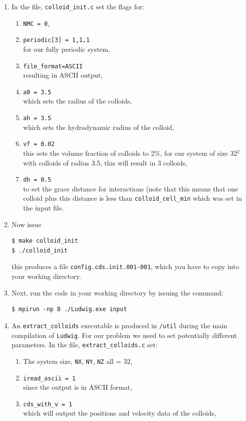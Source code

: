 \documentclass[11pt,twoside,a4paper]{article}
\begin{document}
\begin{enumerate}
\item In the file, \texttt{colloid\_init.c} set the flags for:
\begin{enumerate}
\item \texttt{NMC = 0},
\item \texttt{periodic[3] = {1,1,1}} \\ for our fully periodic system,
\item \texttt{file\_format=ASCII} \\ resulting in ASCII output,
\item \texttt{a0 = 3.5} \\ which sets the radius of the colloids,
\item \texttt{ah = 3.5} \\ which sets the hydrodynamic radius of the colloid,
\item \texttt{vf = 0.02} \\ this sets the volume fraction of colloids to 2\%, for our system of size 32$^2$ with colloids of radius 3.5, this will result in 3 colloids,
\item \texttt{dh = 0.5} \\ to set the grace distance for interactions (note that this means that one colloid plus this distance is less than \texttt{colloid\_cell\_min} which was set in the input file.
\end{enumerate}
\item Now issue
\begin{lstlisting}
$ make colloid_init
$ ./colloid_init
\end{lstlisting}
this produces a file \texttt{config.cds.init.001-001}, which you have to copy into your working directory.
\item Next, run the code in your working directory by issuing the command:
\begin{lstlisting}
$ mpirun -np 8 ./Ludwig.exe input
\end{lstlisting}
\item An \texttt{extract\_colloids} executable is produced in \texttt{/util} during the main compilation of \texttt{Ludwig}. 
For our problem we need to set potentially different parameters. In the file, \texttt{extract\_colloids.c} set:
\begin{enumerate}
\item The system size, \texttt{NX},  \texttt{NY},  \texttt{NZ} all = 32,
\item \texttt{iread\_ascii = 1} \\ since the output is in ASCII format,
\item \texttt{cds\_with\_v  = 1} \\ which will output the positions and velocity data of the colloids,

\end{enumerate}
\end{enumerate}
\end{document}
